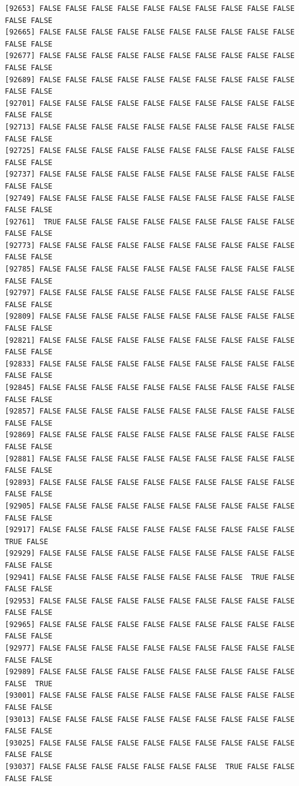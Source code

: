\documentclass[
  a4paper,
  DIV=11,
  numbers=noendperiod]{scrartcl}
\begin{document}
\begin{verbatim}
[92653] FALSE FALSE FALSE FALSE FALSE FALSE FALSE FALSE FALSE FALSE FALSE FALSE
[92665] FALSE FALSE FALSE FALSE FALSE FALSE FALSE FALSE FALSE FALSE FALSE FALSE
[92677] FALSE FALSE FALSE FALSE FALSE FALSE FALSE FALSE FALSE FALSE FALSE FALSE
[92689] FALSE FALSE FALSE FALSE FALSE FALSE FALSE FALSE FALSE FALSE FALSE FALSE
[92701] FALSE FALSE FALSE FALSE FALSE FALSE FALSE FALSE FALSE FALSE FALSE FALSE
[92713] FALSE FALSE FALSE FALSE FALSE FALSE FALSE FALSE FALSE FALSE FALSE FALSE
[92725] FALSE FALSE FALSE FALSE FALSE FALSE FALSE FALSE FALSE FALSE FALSE FALSE
[92737] FALSE FALSE FALSE FALSE FALSE FALSE FALSE FALSE FALSE FALSE FALSE FALSE
[92749] FALSE FALSE FALSE FALSE FALSE FALSE FALSE FALSE FALSE FALSE FALSE FALSE
[92761]  TRUE FALSE FALSE FALSE FALSE FALSE FALSE FALSE FALSE FALSE FALSE FALSE
[92773] FALSE FALSE FALSE FALSE FALSE FALSE FALSE FALSE FALSE FALSE FALSE FALSE
[92785] FALSE FALSE FALSE FALSE FALSE FALSE FALSE FALSE FALSE FALSE FALSE FALSE
[92797] FALSE FALSE FALSE FALSE FALSE FALSE FALSE FALSE FALSE FALSE FALSE FALSE
[92809] FALSE FALSE FALSE FALSE FALSE FALSE FALSE FALSE FALSE FALSE FALSE FALSE
[92821] FALSE FALSE FALSE FALSE FALSE FALSE FALSE FALSE FALSE FALSE FALSE FALSE
[92833] FALSE FALSE FALSE FALSE FALSE FALSE FALSE FALSE FALSE FALSE FALSE FALSE
[92845] FALSE FALSE FALSE FALSE FALSE FALSE FALSE FALSE FALSE FALSE FALSE FALSE
[92857] FALSE FALSE FALSE FALSE FALSE FALSE FALSE FALSE FALSE FALSE FALSE FALSE
[92869] FALSE FALSE FALSE FALSE FALSE FALSE FALSE FALSE FALSE FALSE FALSE FALSE
[92881] FALSE FALSE FALSE FALSE FALSE FALSE FALSE FALSE FALSE FALSE FALSE FALSE
[92893] FALSE FALSE FALSE FALSE FALSE FALSE FALSE FALSE FALSE FALSE FALSE FALSE
[92905] FALSE FALSE FALSE FALSE FALSE FALSE FALSE FALSE FALSE FALSE FALSE FALSE
[92917] FALSE FALSE FALSE FALSE FALSE FALSE FALSE FALSE FALSE FALSE  TRUE FALSE
[92929] FALSE FALSE FALSE FALSE FALSE FALSE FALSE FALSE FALSE FALSE FALSE FALSE
[92941] FALSE FALSE FALSE FALSE FALSE FALSE FALSE FALSE  TRUE FALSE FALSE FALSE
[92953] FALSE FALSE FALSE FALSE FALSE FALSE FALSE FALSE FALSE FALSE FALSE FALSE
[92965] FALSE FALSE FALSE FALSE FALSE FALSE FALSE FALSE FALSE FALSE FALSE FALSE
[92977] FALSE FALSE FALSE FALSE FALSE FALSE FALSE FALSE FALSE FALSE FALSE FALSE
[92989] FALSE FALSE FALSE FALSE FALSE FALSE FALSE FALSE FALSE FALSE FALSE  TRUE
[93001] FALSE FALSE FALSE FALSE FALSE FALSE FALSE FALSE FALSE FALSE FALSE FALSE
[93013] FALSE FALSE FALSE FALSE FALSE FALSE FALSE FALSE FALSE FALSE FALSE FALSE
[93025] FALSE FALSE FALSE FALSE FALSE FALSE FALSE FALSE FALSE FALSE FALSE FALSE
[93037] FALSE FALSE FALSE FALSE FALSE FALSE FALSE  TRUE FALSE FALSE FALSE FALSE

\end{verbatim}
\end{document}

